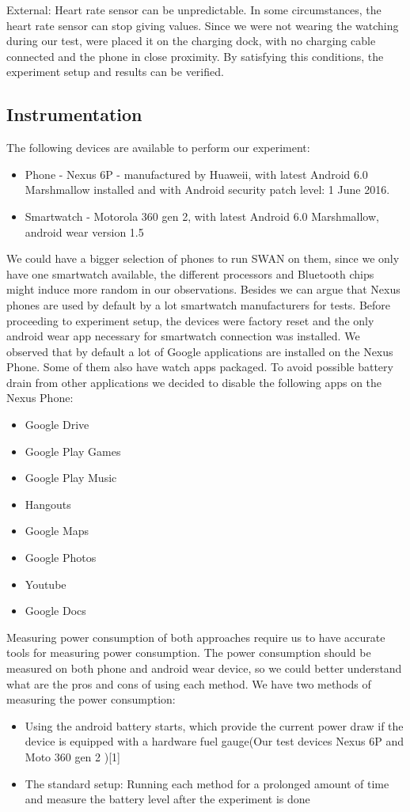  External: Heart rate sensor can be unpredictable. In some circumstances, the heart rate sensor can stop giving values. 
 Since we were not wearing the watching during our test, were placed it on the charging dock, with no charging cable connected and the phone
 in close proximity. By satisfying this conditions, the experiment setup and results can be verified.
 
 \subsection{Instrumentation}
 The following devices are available to perform our experiment:
 \begin{itemize}
  \item Phone - Nexus 6P - manufactured by Huaweii,  with latest Android 6.0 Marshmallow installed and with Android security patch level: 1 June 2016. 
  \item Smartwatch - Motorola 360 gen 2, with latest Android 6.0 Marshmallow, android wear version 1.5 
 \end{itemize}

 We could have a bigger selection of phones to run SWAN on them, since we only have one smartwatch available,
 the different processors  and Bluetooth chips might induce more random in our observations.
 Besides we can argue that Nexus phones are used by default by a lot smartwatch manufacturers for tests.
 Before proceeding to experiment setup, the devices were factory reset and the only android wear app necessary for smartwatch connection was installed.
 We observed that by default a lot of Google applications are installed on the Nexus Phone. Some of them also have watch apps packaged.
 To avoid possible battery drain from other applications we decided to disable the following apps on the Nexus Phone:
 \begin{itemize}
  \item  Google Drive
  \item Google Play Games
  \item Google Play Music
  \item Hangouts
  \item Google Maps
  \item Google Photos
  \item Youtube
  \item Google Docs
 \end{itemize}

 Measuring power consumption of both approaches require us to have accurate tools for measuring power consumption.
 The power consumption should be measured on both phone and android wear device, so we could better understand what are the pros and cons of using each method.
 We have two methods of measuring the power consumption:
 \begin{itemize}
  \item Using the android battery starts, which provide the current power draw if the device is equipped with a hardware fuel gauge(Our test devices Nexus 6P and Moto 360 gen 2 )[1]
  \item The standard setup: Running each method for a prolonged amount of time and measure the battery level after the experiment is done
 \end{itemize}

